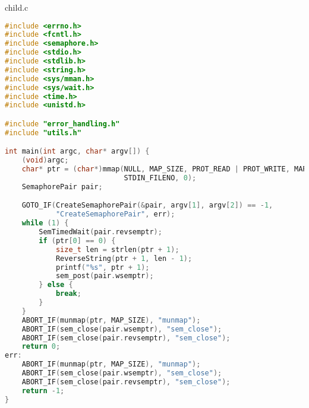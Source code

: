 \documentclass[a4paper, 12pt]{article}
\begin{document}
child.c
\begin{lstlisting}[language=C++]
#include <errno.h>
#include <fcntl.h>
#include <semaphore.h>
#include <stdio.h>
#include <stdlib.h>
#include <string.h>
#include <sys/mman.h>
#include <sys/wait.h>
#include <time.h>
#include <unistd.h>

#include "error_handling.h"
#include "utils.h"

int main(int argc, char* argv[]) {
    (void)argc;
    char* ptr = (char*)mmap(NULL, MAP_SIZE, PROT_READ | PROT_WRITE, MAP_SHARED,
                            STDIN_FILENO, 0);
    SemaphorePair pair;

    GOTO_IF(CreateSemaphorePair(&pair, argv[1], argv[2]) == -1,
            "CreateSemaphorePair", err);
    while (1) {
        SemTimedWait(pair.revsemptr);
        if (ptr[0] == 0) {
            size_t len = strlen(ptr + 1);
            ReverseString(ptr + 1, len - 1);
            printf("%s", ptr + 1);
            sem_post(pair.wsemptr);
        } else {
            break;
        }
    }
    ABORT_IF(munmap(ptr, MAP_SIZE), "munmap");
    ABORT_IF(sem_close(pair.wsemptr), "sem_close");
    ABORT_IF(sem_close(pair.revsemptr), "sem_close");
    return 0;
err:
    ABORT_IF(munmap(ptr, MAP_SIZE), "munmap");
    ABORT_IF(sem_close(pair.wsemptr), "sem_close");
    ABORT_IF(sem_close(pair.revsemptr), "sem_close");
    return -1;
}
\end{lstlisting}
\end{document}
